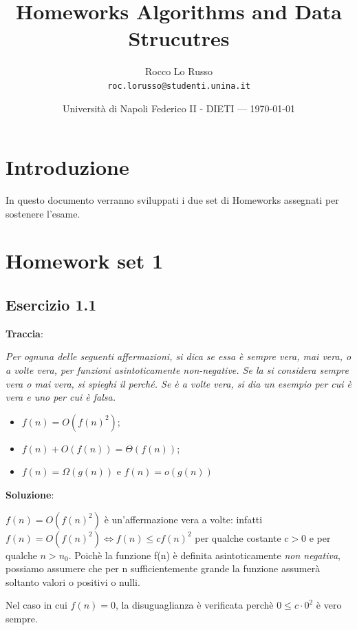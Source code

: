 \documentclass{article}
\title{Homeworks Algorithms and Data Strucutres} %
\author{Rocco Lo Russo\\ \texttt{roc.lorusso@studenti.unina.it}} %
\date{Università di Napoli Federico II - DIETI --- \today} %
\begin{document}
\maketitle %


\section*{Introduzione} %
In questo documento verranno sviluppati i due set di Homeworks assegnati per sostenere l'esame.

\section{Homework set 1} \label{sec:homework_1}%
\subsection{Esercizio 1.1} \label{subsec:esercizio1_1}
\textbf{Traccia}:

\noindent
\textit{Per ognuna delle seguenti affermazioni, si dica se essa è sempre vera, mai vera, o a volte 
vera, per funzioni asintoticamente non-negative. Se la si considera sempre vera o mai vera, 
si spieghi il perché. Se è a volte vera, si dia un esempio per cui è vera e uno per cui è falsa.}
\begin{itemize}
    \item $f(n) = O(f(n)^2)$;
    \item $f(n) + O(f(n)) =  \Theta(f(n))$;
    \item $ f(n) = \Omega(g(n))$ e $f(n) = o(g(n))$
\end{itemize}
\vspace{\baselineskip}

\noindent
\textbf{Soluzione}: 

\noindent
$f(n) = O(f(n)^2) $ è un'affermazione vera a volte: infatti $f(n) = O(f(n)^2) \iff f(n) \le cf(n)^2 $ per qualche costante $ c>0 $ e per qualche $n > n_0$. Poichè la funzione f(n) è definita asintoticamente \textit{non negativa}, possiamo assumere che per n sufficientemente grande la funzione assumerà soltanto valori o positivi o nulli. 

\noindent
Nel caso in cui $f(n) = 0$, la disuguaglianza è verificata perchè $ 0 \le c \cdot 0^2$ è vero sempre. 
\end{document}
